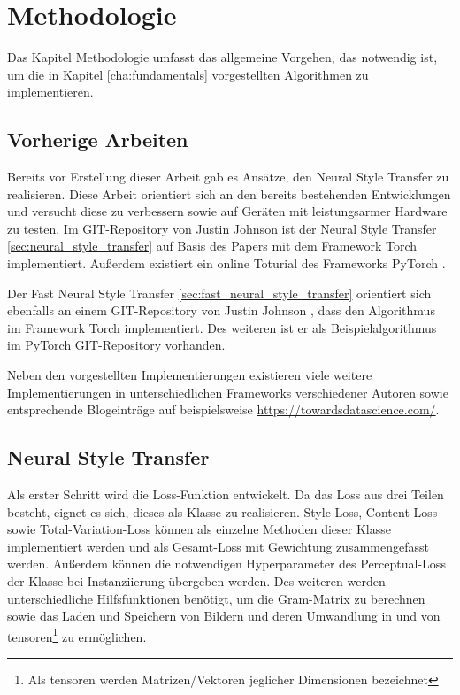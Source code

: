 \chapter{Methodologie}
\label{cha:methodology}

Das Kapitel Methodologie umfasst das allgemeine Vorgehen, das notwendig ist, um die in Kapitel \ref{cha:fundamentals} vorgestellten Algorithmen zu implementieren.

\section{Vorherige Arbeiten}

Bereits vor Erstellung dieser Arbeit gab es Ansätze, den Neural Style Transfer zu realisieren. Diese Arbeit orientiert sich an den bereits bestehenden Entwicklungen und versucht diese zu verbessern sowie auf Geräten mit leistungsarmer Hardware zu testen. Im GIT-Repository von Justin Johnson \cite{Johnson2015} ist der Neural Style Transfer \ref{sec:neural_style_transfer} auf Basis des Papers \cite{DBLP:journals/corr/GatysEB15a} mit dem Framework Torch \cite{torch} implementiert. Außerdem existiert ein online Toturial des Frameworks PyTorch \cite{OnlineToturialNeuralStylePyTorch}.

Der Fast Neural Style Transfer \ref{sec:fast_neural_style_transfer} orientiert sich ebenfalls an einem GIT-Repository von Justin Johnson \cite{Johnson2016}, dass den Algorithmus im Framework Torch implementiert. Des weiteren ist er als Beispielalgorithmus im PyTorch GIT-Repository \cite{PyTorchFastNeuralStyle} vorhanden.

Neben den vorgestellten Implementierungen existieren viele weitere Implementierungen in unterschiedlichen Frameworks verschiedener Autoren sowie entsprechende Blogeinträge auf beispielsweise \url{https://towardsdatascience.com/}.

\pagebreak

\section{Neural Style Transfer}
\label{sec:method_neural_style_transfer}

Als erster Schritt wird die Loss-Funktion entwickelt. Da das Loss aus drei Teilen besteht, eignet es sich, dieses als Klasse zu realisieren. Style-Loss, Content-Loss sowie Total-Variation-Loss können als einzelne Methoden dieser Klasse implementiert werden und als Gesamt-Loss mit Gewichtung zusammengefasst werden. Außerdem können die notwendigen Hyperparameter des Perceptual-Loss der Klasse bei Instanziierung übergeben werden. Des weiteren werden unterschiedliche Hilfsfunktionen benötigt, um die Gram-Matrix zu berechnen sowie das Laden und Speichern von Bildern und deren Umwandlung in und von \gls{tensor}en\footnote{Als \gls{tensor}en werden Matrizen/Vektoren jeglicher Dimensionen bezeichnet} zu ermöglichen.


